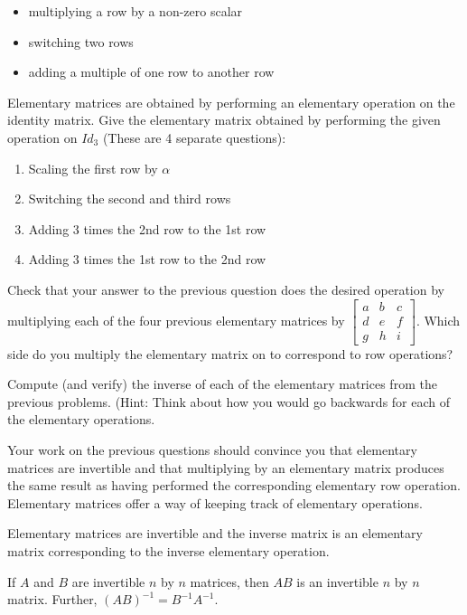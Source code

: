 \begin{itemize}
\item multiplying a row by a non-zero scalar
\item switching two rows
\item adding a multiple of one row to another row
\end{itemize}
Elementary matrices are obtained by performing an elementary operation on the identity matrix.
\bq Give the elementary matrix obtained by performing the given operation on $Id_3$ (These are 4 separate questions):
\begin{enumerate}
\item Scaling the first row by $\alpha$
\item Switching the second and third rows
\item Adding 3 times the 2nd row to the 1st row
\item Adding 3 times the 1st row to the 2nd row
\end{enumerate}
\eq

\bq Check that your answer to the previous question does the desired operation by multiplying each of the four previous elementary matrices by $\begin{bmatrix} a&b&c\\d&e&f\\g&h&i \end{bmatrix}$. Which side do you multiply the elementary matrix on to correspond to row operations?
\eq

\bq Compute (and verify) the inverse of each of the elementary matrices from the previous problems. (Hint: Think about how you would go backwards for each of the elementary operations.
\eq

Your work on the previous questions should convince you that elementary matrices are invertible and that multiplying by an elementary matrix produces the same result as having performed the corresponding elementary row operation. Elementary matrices offer a way of keeping track of elementary operations.
\begin{theorem}
Elementary matrices are invertible and the inverse matrix is an elementary matrix corresponding to the inverse elementary operation.
\end{theorem}

\begin{theorem}
If $A$ and $B$ are invertible $n$ by $n$ matrices, then $AB$ is an invertible $n$ by $n$ matrix. Further, $(AB)^{-1} =B^{-1}A^{-1}$.
\end{theorem}

